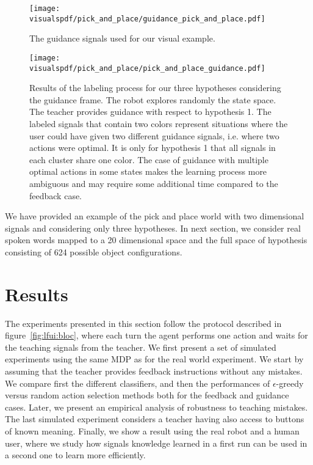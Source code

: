 \begin{figure}[H]
  \centering
  \texttt{[image: \\visualspdf/pick\_and\_place/guidance\_pick\_and\_place.pdf]}
  \caption{The guidance signals used for our visual example.}
  \label{fig:lfui:pickplaceguidancesignals}
\end{figure}

\begin{figure}[H]
  \centering
  \texttt{[image: \\visualspdf/pick\_and\_place/pick\_and\_place\_guidance.pdf]}
  \caption{Results of the labeling process for our three hypotheses considering the guidance frame. The robot explores randomly the state space. The teacher provides guidance with respect to hypothesis 1. The labeled signals that contain two colors represent situations where the user could have given two different guidance signals, i.e. where two actions were optimal. It is only for hypothesis 1 that all signals in each cluster share one color. The case of guidance with multiple optimal actions in some states makes the learning process more ambiguous and may require some additional time compared to the feedback case.}
  \label{fig:lfui:pickplaceguidance}
\end{figure}

\newpage


We have provided an example of the pick and place world with two dimensional signals and considering only three hypotheses. In next section, we consider real spoken words mapped to a 20 dimensional space and the full space of hypothesis consisting of 624 possible object configurations.

\section{Results}
\label{chapter:lfui:results}

The experiments presented in this section follow the protocol described in figure~\ref{fig:lfui:bloc}, where each turn the agent performs one action and waits for the teaching signals from the teacher. We first present a set of simulated experiments using the same MDP as for the real world experiment. We start by assuming that the teacher provides feedback instructions without any mistakes. %
We compare first the different classifiers, and then the performances of $\epsilon$-greedy versus random action selection methods both for the feedback and guidance cases. Later, we present an empirical analysis of robustness to teaching mistakes. The last simulated experiment considers a teacher having also access to buttons of known meaning. Finally, we show a result using the real robot and a human user, where we study how signals knowledge learned in a first run can be used in a second one to learn more efficiently.

